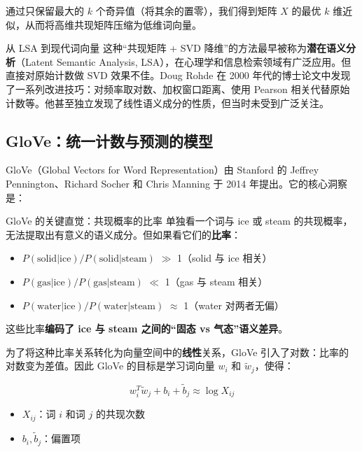 \documentclass[a4paper]{article}
\begin{document}
通过只保留最大的 $k$ 个奇异值（将其余的置零），我们得到矩阵 $X$ 的最优 $k$ 维近似，从而将高维共现矩阵压缩为低维词向量。

\begin{knowledgebox}{从 LSA 到现代词向量}
这种``共现矩阵 + SVD 降维''的方法最早被称为\textbf{潜在语义分析}（Latent Semantic Analysis, LSA），在心理学和信息检索领域有广泛应用。但直接对原始计数做 SVD 效果不佳。Doug Rohde 在 2000 年代的博士论文中发现了一系列改进技巧：对频率取对数、加权窗口距离、使用 Pearson 相关代替原始计数等。他甚至独立发现了线性语义成分的性质，但当时未受到广泛关注。
\end{knowledgebox}

\subsection{GloVe：统一计数与预测的模型}




GloVe（Global Vectors for Word Representation）由 Stanford 的 Jeffrey Pennington、Richard Socher 和 Chris Manning 于 2014 年提出。它的核心洞察是：

\begin{importantbox}{GloVe 的关键直觉：共现概率的比率}
单独看一个词与 ice 或 steam 的共现概率，无法提取出有意义的语义成分。但如果看它们的\textbf{比率}：
\begin{itemize}
    \item $P(\text{solid} | \text{ice}) / P(\text{solid} | \text{steam})$ $\gg$ 1（solid 与 ice 相关）
    \item $P(\text{gas} | \text{ice}) / P(\text{gas} | \text{steam})$ $\ll$ 1（gas 与 steam 相关）
    \item $P(\text{water} | \text{ice}) / P(\text{water} | \text{steam})$ $\approx$ 1（water 对两者无偏）
\end{itemize}
这些比率\textbf{编码了 ice 与 steam 之间的``固态 vs 气态''语义差异}。
\end{importantbox}

为了将这种比率关系转化为向量空间中的\textbf{线性}关系，GloVe 引入了对数：比率的对数变为差值。因此 GloVe 的目标是学习词向量 $w_i$ 和 $\tilde{w}_j$，使得：

$$w_i^T \tilde{w}_j + b_i + \tilde{b}_j \approx \log X_{ij}$$

\begin{itemize}
    \item $X_{ij}$：词 $i$ 和词 $j$ 的共现次数
    \item $b_i, \tilde{b}_j$：偏置项
\end{itemize}
\end{document}
